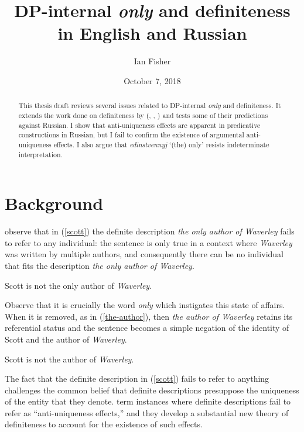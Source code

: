 \documentclass{article}
\title{DP-internal \textit{only} and definiteness in English and Russian}
\author{Ian Fisher}
\date{October 7, 2018}
\begin{document}
\maketitle


\begin{abstract}
This thesis draft reviews several issues related to DP-internal \textit{only} and definiteness. It extends the work done on definiteness by \citeauthor{cb2015} (\citeyear{cb2012a}, \citeyear{cb2012b}, \citeyear{cb2015}) and tests some of their predictions against Russian. I show that anti-uniqueness effects are apparent in predicative constructions in Russian, but I fail to confirm the existence of argumental anti-uniqueness effects. I also argue that \textit{edinstvennyj} `(the) only' resists indeterminate interpretation.
\end{abstract}


\section{Background}
\citet{cb2015} observe that in (\ref{scott}) the definite description \textit{the only author of Waverley} fails to refer to any individual: the sentence is only true in a context where \textit{Waverley} was written by multiple authors, and consequently there can be no individual that fits the description \textit{the only author of Waverley}.

\begin{exe}
	\ex \label{scott} Scott is not the only author of \textit{Waverley}.
\end{exe}

Observe that it is crucially the word \textit{only} which instigates this state of affairs. When it is removed, as in (\ref{the-author}), then \textit{the author of Waverley} retains its referential status and the sentence becomes a simple negation of the identity of Scott and the author of \textit{Waverley}.

\begin{exe}
	\ex \label{the-author} Scott is not the author of \textit{Waverley}.
\end{exe}

The fact that the definite description in (\ref{scott}) fails to refer to anything challenges the common belief that definite descriptions presuppose the uniqueness of the entity that they denote. \citeauthor{cb2015} term instances where definite descriptions fail to refer as ``anti-uniqueness effects,'' and they develop a substantial new theory of definiteness to account for the existence of such effects.
\end{document}
